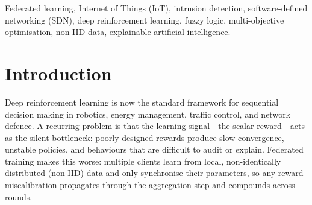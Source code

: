 \documentclass[journal]{IEEEtran}
\newcommand{\rev}[1]{\textcolor{red}{#1}}
\newcommand{\strk}[1]{\textcolor{red}{\st{#1}}}
\begin{document}
\begin{abstract}
$26.98\%$ to $0.18\%$ ($150\times$ reduction), \rev{a gain that is attained at the federated phase B3 (FedProx) before fuzzy augmentation is applied; the full pipeline (phase B4) has an FPR of $4.21\%$ on DIAD2024 and loses $5.5$ percentage points of MSR against B3, which we report honestly in Sec.~\ref{sec:r6_envelope} as an operational envelope of AFRAS-FL.} \rev{Similarly, the head-to-head gains reported against FedAvg and FedProx correspond to the full pipeline that jointly benefits from MOSAR's multi-objective decomposition, from the coordination term, and from AFRAS-FL; a controlled per-component ablation ($R_{\text{MOSAR}}$ alone, $R_{\text{MOSAR}}$+$R_{\text{link}}$, $R_{\text{MOSAR}}$+AFRAS-FL, complete) is discussed in Sec.~\ref{sec:limitations} as immediate follow-up work.} \strk{but loses $3.3$ pp on FedProx MSR and is outperformed on FedAvg FPR.} Jain fairness remains
in $[0.9694, 1.0000]$. The complete numerical comparison yields
$21/24$ head-to-head wins. A sensitivity analysis across
$\lambda \in \{0.10, 0.25, 0.50\}$ on CICIoT2023 shows the MSR varies
by at most $1.26$ percentage points, so the reported results are not
an artefact of a particular $\lambda$. A Fuzzy-TOPSIS multi-criteria
evaluation across six sensitivity scenarios ranks the selected
backbone first in $5/6$ scenarios on CICIoT2023 and $6/6$ on
DIAD2024. The framework is a drop-in reward-shaping module for any
value-based federated DRL system that needs interpretable,
multi-objective behaviour at the IoT edge.
\end{abstract}

\begin{IEEEkeywords}
Federated learning, Internet of Things (IoT), intrusion detection,
software-defined networking (SDN), deep reinforcement learning,
fuzzy logic, multi-objective optimisation, non-IID data, explainable
artificial intelligence.
\end{IEEEkeywords}

\section{Introduction}\label{sec:introduction}

Deep reinforcement learning is now the standard framework for
sequential decision making in robotics, energy management, traffic
control, and network defence\cite{lecun2015deep,arrieta2020xai}. A
recurring problem is that the learning signal---the scalar
reward---acts as the silent bottleneck: poorly designed rewards
produce slow convergence, unstable policies, and behaviours that are
difficult to audit or explain\cite{ferrag2020deep}. Federated
training makes this worse: multiple clients learn from local,
non-identically distributed (non-IID) data and only synchronise their
parameters, so any reward miscalibration propagates through the
aggregation step and compounds across rounds\cite{mcmahan2017fedavg,
li2020fedprox,kairouz2021advances,zhao2018noniid}.
\end{document}
